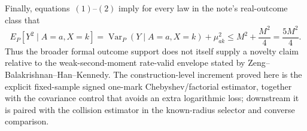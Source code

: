 Finally, equations~\((1)\)--\((2)\) imply for every law in the note's real-outcome class that
\[
 E_P[Y^2\mid A=a,X=k]
 =\operatorname{Var}_P(Y\mid A=a,X=k)+\mu_{ak}^2
 \le M^2+\frac{M^2}{4}=\frac{5M^2}{4}.
\tag{17}
\]
Thus the broader formal outcome support does not itself supply a novelty claim relative to the weak-second-moment rate-valid envelope stated by Zeng--Balakrishnan--Han--Kennedy.  The construction-level increment proved here is the explicit fixed-sample signed one-mark Chebyshev/factorial estimator, together with the covariance control that avoids an extra logarithmic loss; downstream it is paired with the collision estimator in the known-radius selector and converse comparison.